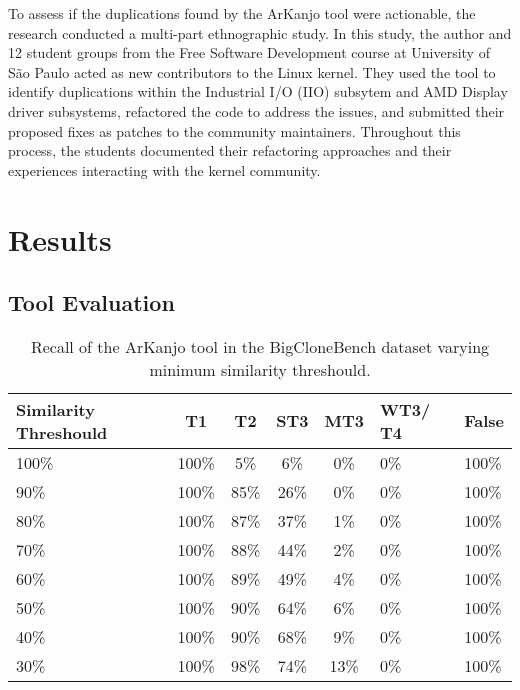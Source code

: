 \documentclass[conference]{IEEEtran}
\begin{document}
To assess if the duplications found by the ArKanjo tool were actionable, the research conducted 
a multi-part ethnographic study. In this study, the author and 12 student groups from the
Free Software Development course at University of São Paulo acted as new contributors 
to the Linux kernel. 
They used the tool to identify duplications within the Industrial I/O (IIO) subsytem and AMD Display 
driver subsystems, refactored the code to address the issues, and submitted their proposed 
fixes as patches to the community maintainers. Throughout this process, the students documented 
their refactoring approaches and their experiences interacting with the kernel community.

\section{Results}

\subsection{Tool Evaluation}

\begin{table}[!t]

\centering

\renewcommand{\arraystretch}{1.3}
\begin{tabular}{ | m{13mm} | c | c | c | c | m{6mm} | m{6mm} | }

\hline

\textbf{Similarity Threshould} & \textbf{T1} & \textbf{T2} & ST3 & MT3
& WT3/ T4 & \textbf{False} \\ \hline

100\% & 100\% & 5\% & 6\% & 0\% & 0\% & 100\% \\ \hline
90\% & 100\% & 85\% & 26\% & 0\% & 0\% & 100\% \\ \hline
80\% & 100\% & 87\% & 37\% & 1\% & 0\% & 100\% \\ \hline
70\% & 100\% & 88\% & 44\% & 2\% & 0\% & 100\% \\ \hline
60\% & 100\% & 89\% & 49\% & 4\% & 0\% & 100\% \\ \hline
50\% & 100\% & 90\% & 64\% & 6\% & 0\% & 100\% \\ \hline
40\% & 100\% & 90\% & 68\% & 9\% & 0\% & 100\% \\ \hline
30\% & 100\% & 98\% & 74\% & 13\% & 0\% & 100\% \\ \hline

\hline
\end{tabular}
\caption{Recall of the ArKanjo tool in the BigCloneBench dataset varying minimum similarity threshould.}
\label{tab:bigclone}
\end{table}
\end{document}
